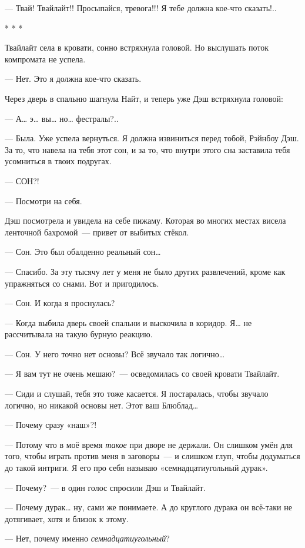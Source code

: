 \documentclass[twoside,a5paper,12pt]{extbook}
\begin{document}
— Твай! Твайлайт!! Просыпайся, тревога!!! Я тебе должна кое-что сказать!..

\begin{center}* * *\end{center}

Твайлайт села в кровати, сонно встряхнула головой. Но выслушать поток компромата не успела.

— Нет. Это я должна кое-что сказать.

Через дверь в спальню шагнула Найт, и теперь уже Дэш встряхнула головой:

— А… э… вы… но… фестралы?..

— Была. Уже успела вернуться. Я должна извиниться перед тобой, Рэйнбоу Дэш. За то, что навела на тебя этот сон, и за то, что внутри этого сна заставила тебя усомниться в твоих подругах.

— СОН?!

— Посмотри на себя.

Дэш посмотрела и увидела на себе пижаму. Которая во многих местах висела ленточной бахромой — привет от выбитых стёкол.

— Сон. Это был обалденно реальный сон…

— Спасибо. За эту тысячу лет у меня не было других развлечений, кроме как упражняться со снами. Вот и пригодилось.

— Сон. И когда я проснулась?

— Когда выбила дверь своей спальни и выскочила в коридор. Я… не рассчитывала на такую бурную реакцию.

— Сон. У него точно нет основы? Всё звучало так логично…

— Я вам тут не очень мешаю? — осведомилась со своей кровати Твайлайт.

— Сиди и слушай, тебя это тоже касается. Я постаралась, чтобы звучало логично, но никакой основы нет. Этот ваш Блюблад…

— Почему сразу «наш»?!

— Потому что в моё время \textit{такое} при дворе не держали. Он слишком умён для того, чтобы играть против меня в заговоры — и слишком глуп, чтобы додуматься до такой интриги. Я его про себя называю «семнадцатиугольный дурак».

— Почему? — в один голос спросили Дэш и Твайлайт.

— Почему дурак… ну, сами же понимаете. А до круглого дурака он всё-таки не дотягивает, хотя и близок к этому.

— Нет, почему именно \textit{семнадцатиугольный}?
\end{document}
